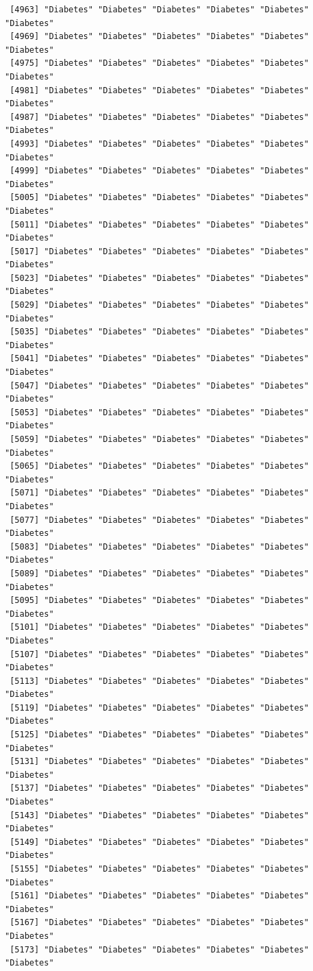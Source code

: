 \documentclass[
  letterpaper,
  DIV=11,
  numbers=noendperiod]{scrartcl}
\begin{document}
\begin{verbatim}
 [4963] "Diabetes" "Diabetes" "Diabetes" "Diabetes" "Diabetes" "Diabetes"
 [4969] "Diabetes" "Diabetes" "Diabetes" "Diabetes" "Diabetes" "Diabetes"
 [4975] "Diabetes" "Diabetes" "Diabetes" "Diabetes" "Diabetes" "Diabetes"
 [4981] "Diabetes" "Diabetes" "Diabetes" "Diabetes" "Diabetes" "Diabetes"
 [4987] "Diabetes" "Diabetes" "Diabetes" "Diabetes" "Diabetes" "Diabetes"
 [4993] "Diabetes" "Diabetes" "Diabetes" "Diabetes" "Diabetes" "Diabetes"
 [4999] "Diabetes" "Diabetes" "Diabetes" "Diabetes" "Diabetes" "Diabetes"
 [5005] "Diabetes" "Diabetes" "Diabetes" "Diabetes" "Diabetes" "Diabetes"
 [5011] "Diabetes" "Diabetes" "Diabetes" "Diabetes" "Diabetes" "Diabetes"
 [5017] "Diabetes" "Diabetes" "Diabetes" "Diabetes" "Diabetes" "Diabetes"
 [5023] "Diabetes" "Diabetes" "Diabetes" "Diabetes" "Diabetes" "Diabetes"
 [5029] "Diabetes" "Diabetes" "Diabetes" "Diabetes" "Diabetes" "Diabetes"
 [5035] "Diabetes" "Diabetes" "Diabetes" "Diabetes" "Diabetes" "Diabetes"
 [5041] "Diabetes" "Diabetes" "Diabetes" "Diabetes" "Diabetes" "Diabetes"
 [5047] "Diabetes" "Diabetes" "Diabetes" "Diabetes" "Diabetes" "Diabetes"
 [5053] "Diabetes" "Diabetes" "Diabetes" "Diabetes" "Diabetes" "Diabetes"
 [5059] "Diabetes" "Diabetes" "Diabetes" "Diabetes" "Diabetes" "Diabetes"
 [5065] "Diabetes" "Diabetes" "Diabetes" "Diabetes" "Diabetes" "Diabetes"
 [5071] "Diabetes" "Diabetes" "Diabetes" "Diabetes" "Diabetes" "Diabetes"
 [5077] "Diabetes" "Diabetes" "Diabetes" "Diabetes" "Diabetes" "Diabetes"
 [5083] "Diabetes" "Diabetes" "Diabetes" "Diabetes" "Diabetes" "Diabetes"
 [5089] "Diabetes" "Diabetes" "Diabetes" "Diabetes" "Diabetes" "Diabetes"
 [5095] "Diabetes" "Diabetes" "Diabetes" "Diabetes" "Diabetes" "Diabetes"
 [5101] "Diabetes" "Diabetes" "Diabetes" "Diabetes" "Diabetes" "Diabetes"
 [5107] "Diabetes" "Diabetes" "Diabetes" "Diabetes" "Diabetes" "Diabetes"
 [5113] "Diabetes" "Diabetes" "Diabetes" "Diabetes" "Diabetes" "Diabetes"
 [5119] "Diabetes" "Diabetes" "Diabetes" "Diabetes" "Diabetes" "Diabetes"
 [5125] "Diabetes" "Diabetes" "Diabetes" "Diabetes" "Diabetes" "Diabetes"
 [5131] "Diabetes" "Diabetes" "Diabetes" "Diabetes" "Diabetes" "Diabetes"
 [5137] "Diabetes" "Diabetes" "Diabetes" "Diabetes" "Diabetes" "Diabetes"
 [5143] "Diabetes" "Diabetes" "Diabetes" "Diabetes" "Diabetes" "Diabetes"
 [5149] "Diabetes" "Diabetes" "Diabetes" "Diabetes" "Diabetes" "Diabetes"
 [5155] "Diabetes" "Diabetes" "Diabetes" "Diabetes" "Diabetes" "Diabetes"
 [5161] "Diabetes" "Diabetes" "Diabetes" "Diabetes" "Diabetes" "Diabetes"
 [5167] "Diabetes" "Diabetes" "Diabetes" "Diabetes" "Diabetes" "Diabetes"
 [5173] "Diabetes" "Diabetes" "Diabetes" "Diabetes" "Diabetes" "Diabetes"

\end{verbatim}
\end{document}
